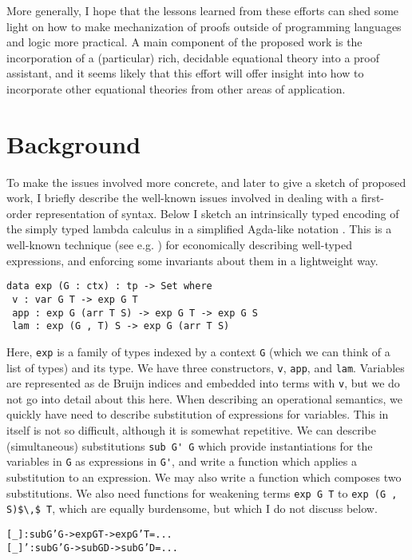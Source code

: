 \documentclass{article}
\begin{document}
More generally, I hope that the lessons learned from these efforts can shed some light on how
to make mechanization of proofs outside of programming languages and
logic more practical. A main component of the proposed work is the
incorporation of a (particular) rich, decidable equational theory into a
proof assistant, and it seems likely that this effort will offer insight into how to
incorporate other equational theories from other areas of
application.

\section{Background}\label{sec:background}
To make the issues involved more concrete, and later to give a sketch
of proposed work, I briefly describe the
well-known issues involved in dealing with a first-order representation of
syntax. Below I sketch an intrinsically typed encoding of the
simply typed lambda calculus in a simplified Agda-like notation \citep{Norell:phd07}. This
is a well-known technique (see e.g. \citep{Benton:12}) for
economically describing well-typed expressions, and enforcing some
invariants about them in a lightweight way.

\begin{verbatim}
data exp (G : ctx) : tp -> Set where
 v : var G T -> exp G T
 app : exp G (arr T S) -> exp G T -> exp G S
 lam : exp (G , T) S -> exp G (arr T S)
\end{verbatim}

Here, \lstinline{exp} is a family of types indexed by  a context
\lstinline{G} (which we can think of a list of types) and its
type. We have three constructors, \lstinline{v}, \lstinline{app}, and
\lstinline{lam}. Variables are represented as de Bruijn indices and
embedded into terms with \lstinline{v}, but we do
not go into detail about this here. When describing an operational
semantics, we quickly have need to describe substitution of
expressions for variables. This in itself is not so difficult,
although it is somewhat repetitive. We can
describe (simultaneous) substitutions \lstinline{sub G' G} which provide
instantiations for the variables in \lstinline{G} as expressions in
\lstinline{G'}, and write a function which applies a substitution to
an expression. We may also write a function which composes two
substitutions. We also need functions for weakening terms
\lstinline{exp G T} to \lstinline{exp (G , S)$\,$ T}, which are equally
burdensome, but which I do not discuss below.

\begin{alltt}
[_] : sub G' G -> exp G T -> exp G' T = ...
[_]' : sub G' G -> sub G D -> sub G' D = ...
\end{alltt}
\end{document}
